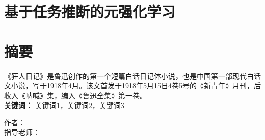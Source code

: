 

\section*{基于任务推断的元强化学习}
\section*{摘要}
《狂人日记》是鲁迅创作的第一个短篇白话日记体小说，也是中国第一部现代白话文小说，写于1918年4月。该文首发于1918年5月15日4卷5号的《新青年》月刊，后收入《呐喊》集，编入《鲁迅全集》第一卷。
\\
\noindent\textbf{关键词：} 关键词1，关键词2，关键词3


\begin{adjustwidth}{25em}{0em}
	作者：\\
	指导老师：
\end{adjustwidth}



\pagestyle{fancy}			%
\chead{}	%

